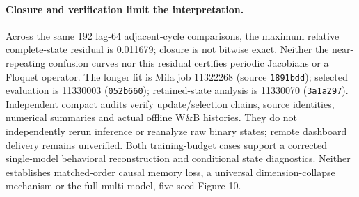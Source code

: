 \paragraph{Closure and verification limit the interpretation.}
Across the same 192 lag-64 adjacent-cycle comparisons, the maximum relative
complete-state residual is 0.011679; closure is not bitwise exact. Neither
the near-repeating confusion curves nor this residual certifies periodic
Jacobians or a Floquet operator. The longer fit is Mila job 11322268
(source \texttt{1891bdd}); selected evaluation is 11330003
(\texttt{052b660}); retained-state analysis is 11330070
(\texttt{3a1a297}). Independent compact audits verify update/selection
chains, source identities, numerical summaries and actual offline W\&B
histories. They do not independently rerun inference or reanalyze raw binary
states; remote dashboard delivery remains unverified. Both training-budget
cases support a corrected single-model behavioral reconstruction and
conditional state diagnostics. Neither establishes matched-order causal
memory loss, a universal dimension-collapse mechanism or the full
multi-model, five-seed Figure 10.
